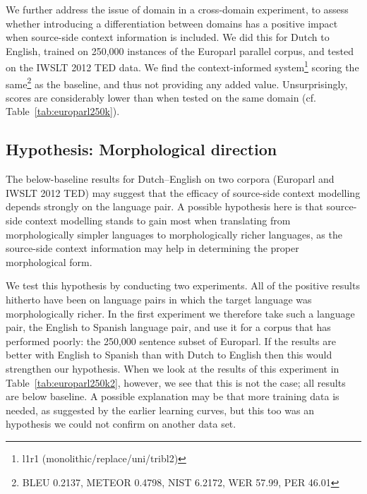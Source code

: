 \documentclass[smallextended]{svjour3}       %
\theoremstyle{break}
\begin{document}
We further address the issue of domain in a cross-domain experiment, to assess
whether introducing a differentiation between domains has a positive impact
when source-side context information is included. We did this for Dutch to
English, trained on 250,000 instances of the Europarl parallel corpus, and
tested on the IWSLT 2012 TED data. We find the context-informed
system\footnote{l1r1 (monolithic/replace/uni/tribl2)} scoring the
same\footnote{BLEU 0.2137, METEOR 0.4798, NIST 6.2172, WER 57.99, PER 46.01} as
the baseline, and thus not providing any added value. Unsurprisingly, scores
are considerably lower than when tested on the same domain (cf.
Table~\ref{tab:europarl250k}).

\subsection{Hypothesis: Morphological direction}
\label{sec:morphdir}

The below-baseline results for Dutch--English on two corpora (Europarl and IWSLT
2012 TED) may suggest that the efficacy of source-side context modelling
depends strongly on the language pair. A possible hypothesis here is that
source-side context modelling stands to gain most when translating from
morphologically simpler languages to morphologically richer languages, as the
source-side context information may help in determining the proper
morphological form. 

We test this hypothesis by conducting two experiments. All of the positive
results hitherto have been on language pairs in which the target language was
morphologically richer.  In the first experiment we therefore take such a
language pair, the English to Spanish language pair, and use it for a corpus
that has performed poorly: the 250,000 sentence subset of Europarl.  If the
results are better with English to Spanish than with Dutch to English
then this would strengthen our hypothesis. When we look at the results of
this experiment in Table~\ref{tab:europarl250k2}, however, we see
that this is not the case; all results are below baseline. A possible
explanation may be that more training data is needed, as suggested by the
earlier learning curves, but this too was an hypothesis we could not confirm on
another data set.
\end{document}
